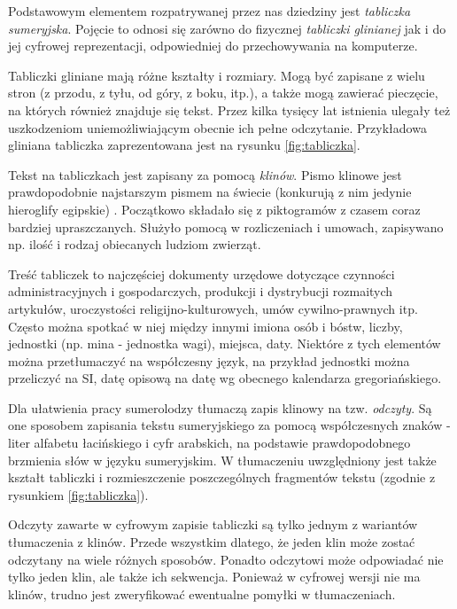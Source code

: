 Podstawowym elementem rozpatrywanej przez nas dziedziny jest \emph{tabliczka sumeryjska}. 
Pojęcie to odnosi się zarówno do fizycznej \emph{tabliczki glinianej} jak i do jej cyfrowej reprezentacji, 
odpowiedniej do przechowywania na komputerze. 

Tabliczki gliniane mają różne kształty i rozmiary. 
Mogą być zapisane z wielu stron (z przodu, z tyłu, od góry, z boku, itp.), a także mogą zawierać pieczęcie, 
na których również znajduje się tekst. Przez kilka tysięcy lat istnienia ulegały też uszkodzeniom uniemożliwiającym 
obecnie ich pełne odczytanie.
Przykładowa gliniana tabliczka zaprezentowana jest na rysunku \ref{fig:tabliczka}.

Tekst na tabliczkach jest zapisany za pomocą \emph{klinów}. Pismo klinowe jest prawdopodobnie najstarszym pismem na świecie 
(konkurują z nim jedynie hieroglify egipskie)  \cite{kuckenburg}. Początkowo składało się z piktogramów z czasem coraz bardziej upraszczanych.
Służyło pomocą w rozliczeniach i umowach, zapisywano np. ilość i rodzaj obiecanych ludziom zwierząt.

Treść tabliczek to najczęściej dokumenty urzędowe dotyczące czynności administracyjnych i gospodarczych, 
produkcji i dystrybucji rozmaitych artykułów, uroczystości religijno-kulturowych, umów cywilno-prawnych itp. \cite{powalka}
Często można spotkać w niej między innymi imiona osób i bóstw, liczby, jednostki (np. mina - jednostka wagi), %
miejsca, daty. Niektóre z tych elementów można przetłumaczyć na współczesny język, na przykład jednostki można przeliczyć na SI, 
datę opisową na datę wg obecnego kalendarza gregoriańskiego. 

Dla ułatwienia pracy sumerolodzy tłumaczą zapis klinowy na tzw. \emph{odczyty}. 
Są one sposobem zapisania tekstu sumeryjskiego za pomocą współczesnych znaków - liter alfabetu łacińskiego i cyfr arabskich, 
na podstawie prawdopodobnego brzmienia słów w języku sumeryjskim. 
W tłumaczeniu uwzględniony jest także kształt tabliczki i rozmieszczenie poszczególnych fragmentów tekstu 
(zgodnie z rysunkiem \ref{fig:tabliczka}). 
 
Odczyty zawarte w cyfrowym zapisie tabliczki są tylko jednym z wariantów tłumaczenia z klinów. 
Przede wszystkim dlatego, że jeden klin może zostać odczytany na wiele różnych sposobów. 
Ponadto odczytowi może odpowiadać nie tylko jeden klin, ale także ich sekwencja. 
Ponieważ w cyfrowej wersji nie ma klinów, trudno jest zweryfikować ewentualne pomyłki w tłumaczeniach.

